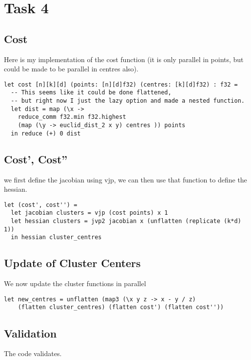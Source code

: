 \documentclass[a4paper,12pt]{article}
\begin{document}
\section*{Task 4}
\subsection*{Cost}
Here is my implementation of the cost function (it is only parallel in
points, but could be made to be parallel in centres also).
\begin{lstlisting}
let cost [n][k][d] (points: [n][d]f32) (centres: [k][d]f32) : f32 =
  -- This seems like it could be done flattened,
  -- but right now I just the lazy option and made a nested function.
  let dist = map (\x ->
    reduce_comm f32.min f32.highest
    (map (\y -> euclid_dist_2 x y) centres )) points
  in reduce (+) 0 dist
\end{lstlisting}
\subsection*{Cost', Cost''}
we first define the jacobian using vjp, we can then use that function to
define the hessian.
\begin{lstlisting}
let (cost', cost'') =
  let jacobian clusters = vjp (cost points) x 1
  let hessian clusters = jvp2 jacobian x (unflatten (replicate (k*d) 1))
  in hessian cluster_centres
\end{lstlisting}
\subsection*{Update of Cluster Centers}
We now update the cluster functions in parallel
\begin{lstlisting}
let new_centres = unflatten (map3 (\x y z -> x - y / z)
    (flatten cluster_centres) (flatten cost') (flatten cost''))
\end{lstlisting}
\subsection*{Validation}
The code validates.
\end{document}
